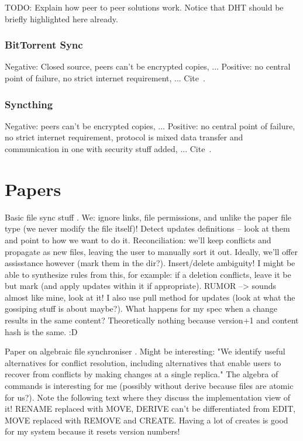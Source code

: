 TODO: Explain how peer to peer solutions work.
Notice that DHT should be briefly highlighted here already.

\subsubsection{BitTorrent Sync}

Negative: Closed source, peers can't be encrypted copies, ...
Positive: no central point of failure, no strict internet requirement, ...
Cite~\cite{web:site:bittorrent_sync}.

\subsubsection{Syncthing}

Negative: peers can't be encrypted copies, ...
Positive: no central point of failure, no strict internet requirement, protocol is mixed data transfer and communication in one with security stuff added, ...
Cite~\cite{web:site:synthing}.

\section{Papers}


Basic file sync stuff \cite{balasubramaniam1998file}.
We: ignore links, file permissions, and unlike the paper file type (we never modify the file itself)!
Detect updates definitions – look at them and point to how we want to do it.
Reconciliation: we'll keep conflicts and propagate as new files, leaving the user to manually sort it out.
Ideally, we'll offer assisstance however (mark them in the dir?).
Insert/delete ambiguity!
I might be able to synthesize rules from this, for example: if a deletion conflicts, leave it be but mark (and apply updates within it if appropriate).
RUMOR --> sounds almost like mine, look at it!
I also use pull method for updates (look at what the gossiping stuff is about maybe?).
What happens for my spec when a change results in the same content?
Theoretically nothing because version+1 and content hash is the same. :D

Paper on algebraic file synchroniser \cite{ramsey2001algebraic}.
Might be interesting: "We identify useful alternatives for conflict resolution, including alternatives that enable users to recover from conflicts by making changes at a single replica."
The algebra of commands is interesting for me (possibly without derive because files are atomic for us?).
Note the following text where they discuss the implementation view of it!
RENAME replaced with MOVE, DERIVE can't be differentiated from EDIT, MOVE replaced with REMOVE and CREATE.
Having a lot of creates is good for my system because it resets version numbers!


